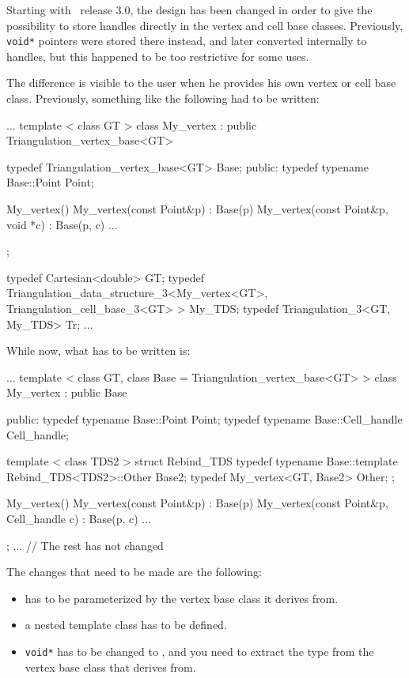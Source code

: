 Starting with \cgal\ release 3.0, the design has been changed in order to
give the possibility to store handles directly in the vertex and cell base
classes.  Previously, \texttt{void*} pointers were stored there instead, and
later converted internally to handles, but this happened to be too restrictive
for some uses.

The difference is visible to the user when he provides his own vertex or cell
base class.  Previously, something like the following had to be written:

\begin{ccExampleCode}
...
template < class GT >
class My_vertex
  : public Triangulation_vertex_base<GT>
{
  typedef Triangulation_vertex_base<GT>  Base;
public:
  typedef typename Base::Point           Point;

  My_vertex() {}
  My_vertex(const Point&p)          : Base(p) {}
  My_vertex(const Point&p, void *c) : Base(p, c) {}
...
};

typedef Cartesian<double>                                               GT;
typedef Triangulation_data_structure_3<My_vertex<GT>,
                                       Triangulation_cell_base_3<GT> >  My_TDS;
typedef Triangulation_3<GT, My_TDS>                                     Tr;
...
\end{ccExampleCode}

While now, what has to be written is:
\begin{ccExampleCode}
...
template < class GT, class Base = Triangulation_vertex_base<GT> >
class My_vertex
  : public Base
{
public:
  typedef typename Base::Point           Point;
  typedef typename Base::Cell_handle     Cell_handle;

  template < class TDS2 >
  struct Rebind_TDS {
    typedef typename Base::template Rebind_TDS<TDS2>::Other  Base2;
    typedef My_vertex<GT, Base2>                             Other;
  };

  My_vertex() {}
  My_vertex(const Point&p)                : Base(p) {}
  My_vertex(const Point&p, Cell_handle c) : Base(p, c) {}
...
};
... // The rest has not changed
\end{ccExampleCode}

The changes that need to be made are the following:
\begin{itemize}
\item{}  has to be parameterized by the vertex base class it
        derives from.
\item{} a nested template class  has to be defined.
\item{} \texttt{void*} has to be changed to , and you need to
	extract the  type from the vertex base class that
         derives from.
\end{itemize}

